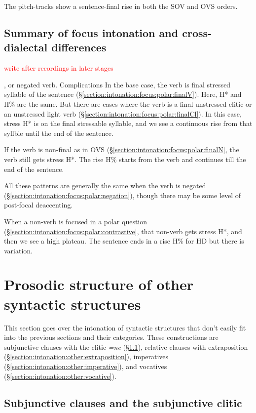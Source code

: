 The pitch-tracks show a sentence-final rise in both the SOV and OVS orders.  






\subsection{Summary of   focus intonation and cross-dialectal differences}\label{section:intonation:focus:summary}
\textcolor{red}{write after recordings in later stages}

, or negated verb. Complications
In the base case, the verb is final stressed syllable of the sentence (\S\ref{section:intonation:focus:polar:finalV}). Here, H* and H\% are the same. But there are cases where the  verb is a final unstressed clitic  or an unstressed light verb (\S\ref{section:intonation:focus:polar:finalCl}). In this case, stress H* is on the final stressable syllable, and we see a continuous rise from that syllble until the end of the sentence. 

If the verb is non-final as in OVS (\S\ref{section:intonation:focus:polar:finalN}, the verb still gets stress H*. The rise H\%  starts from the verb and continues till the end of the sentence. 

All these patterns are generally the same when the verb is negated (\S\ref{section:intonation:focus:polar:negation}), though there may be some level of post-focal deaccenting. 

When a non-verb is focused in a polar question (\S\ref{section:intonation:focus:polar:contrastive}, that non-verb gets stress H*, and then we see a high plateau. The sentence ends in a rise H\% for HD but there is variation. 

\section{Prosodic structure of other syntactic structures}\label{section:intonation:other}
This section goes over the intonation of syntactic structures that don't easily fit into the previous sections and their categories. These constructions     are subjunctive clauses with the clitic \textit{=ne} (\S\ref{section:intonation:other:subjunctive}), relative clauses with extraposition (\S\ref{section:intonation:other:extraposition}), imperatives (\S\ref{section:intonation:other:imperative}), and vocatives (\S\ref{section:intonation:other:vocative}). 

\subsection{Subjunctive clauses and the subjunctive clitic} \label{section:intonation:other:subjunctive}

